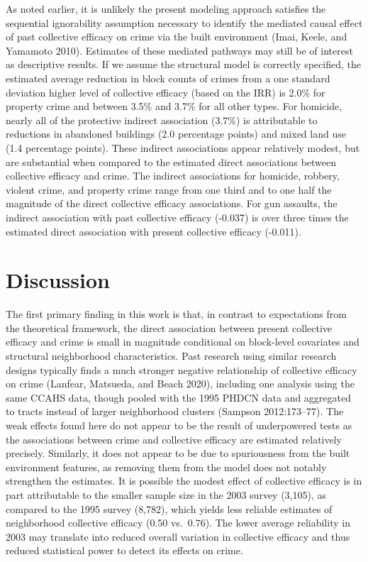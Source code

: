\documentclass [11pt, proquest] {uwthesis}[2015/03/03]
\begin{document}
As noted earlier, it is unlikely the present modeling approach satisfies the sequential ignorability assumption necessary to identify the mediated causal effect of past collective efficacy on crime via the built environment (Imai, Keele, and Yamamoto 2010). Estimates of these mediated pathways may still be of interest as descriptive results. If we assume the structural model is correctly specified, the estimated average reduction in block counts of crimes from a one standard deviation higher level of collective efficacy (based on the IRR) is 2.0\% for property crime and between 3.5\% and 3.7\% for all other types. For homicide, nearly all of the protective indirect association (3.7\%) is attributable to reductions in abandoned buildings (2.0 percentage points) and mixed land use (1.4 percentage points). These indirect associations appear relatively modest, but are substantial when compared to the estimated direct associations between collective efficacy and crime. The indirect associations for homicide, robbery, violent crime, and property crime range from one third and to one half the magnitude of the direct collective efficacy associations. For gun assaults, the indirect association with past collective efficacy (-0.037) is over three times the estimated direct association with present collective efficacy (-0.011).

\hypertarget{discussion}{%
\section{Discussion}\label{discussion}}

The first primary finding in this work is that, in contrast to expectations from the theoretical framework, the direct association between present collective efficacy and crime is small in magnitude conditional on block-level covariates and structural neighborhood characteristics. Past research using similar research designs typically finds a much stronger negative relationship of collective efficacy on crime (Lanfear, Matsueda, and Beach 2020), including one analysis using the same CCAHS data, though pooled with the 1995 PHDCN data and aggregated to tracts instead of larger neighborhood clusters (Sampson 2012:173--77). The weak effects found here do not appear to be the result of underpowered tests as the associations between crime and collective efficacy are estimated relatively precisely. Similarly, it does not appear to be due to spuriousness from the built environment features, as removing them from the model does not notably strengthen the estimates. It is possible the modest effect of collective efficacy is in part attributable to the smaller sample size in the 2003 survey (3,105), as compared to the 1995 survey (8,782), which yields less reliable estimates of neighborhood collective efficacy (0.50 vs.~0.76). The lower average reliability in 2003 may translate into reduced overall variation in collective efficacy and thus reduced statistical power to detect its effects on crime.
\end{document}
